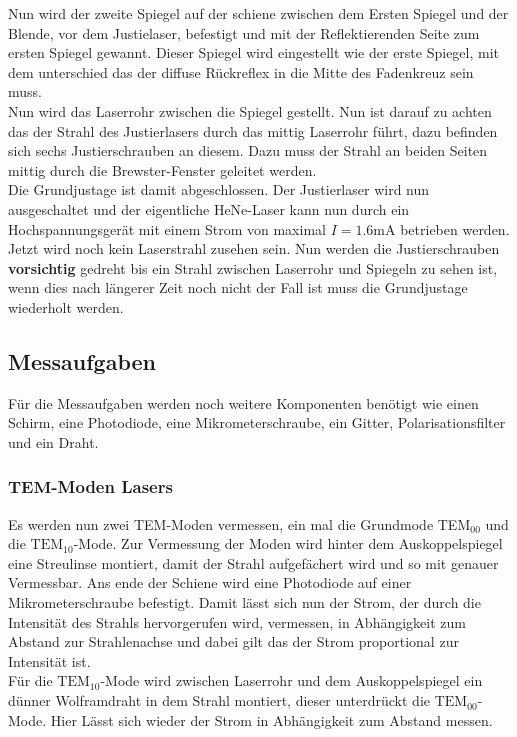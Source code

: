 Nun wird der zweite Spiegel auf der schiene zwischen dem Ersten Spiegel und der Blende, vor dem Justielaser, befestigt und mit der Reflektierenden Seite zum ersten Spiegel gewannt. Dieser Spiegel wird eingestellt wie der erste Spiegel, mit dem unterschied das der diffuse Rückreflex in die Mitte des Fadenkreuz sein muss.\\
Nun wird das Laserrohr zwischen die Spiegel gestellt. Nun ist darauf zu achten das der Strahl des Justierlasers durch das mittig Laserrohr führt, dazu befinden sich sechs Justierschrauben an diesem. Dazu muss der Strahl an beiden Seiten mittig durch die Brewster-Fenster geleitet werden.\\
Die Grundjustage ist damit abgeschlossen. Der Justierlaser wird nun ausgeschaltet und der eigentliche HeNe-Laser kann nun durch ein Hochspannungsgerät mit einem Strom von maximal $I=1.6$mA betrieben werden. Jetzt wird noch kein Laserstrahl zusehen sein. Nun werden die Justierschrauben \textbf{vorsichtig} gedreht bis ein Strahl zwischen Laserrohr und Spiegeln zu sehen ist, wenn dies nach längerer Zeit noch nicht der Fall ist muss die Grundjustage wiederholt werden.\\


\subsection{Messaufgaben}
Für die Messaufgaben werden noch weitere Komponenten benötigt wie einen Schirm, eine Photodiode, eine Mikrometerschraube, ein Gitter, Polarisationsfilter und ein Draht.
\subsubsection{$\mathbf{TEM}$-Moden Lasers}
Es werden nun zwei TEM-Moden vermessen, ein mal die Grundmode TEM${}_{00}$ und die $\mathrm{TEM}_{10}$-Mode. Zur Vermessung der Moden wird hinter dem Auskoppelspiegel eine Streulinse montiert, damit der Strahl aufgefächert wird und so mit genauer Vermessbar. Ans ende der Schiene wird eine Photodiode auf einer Mikrometerschraube befestigt. Damit lässt sich nun der Strom, der durch die Intensität des Strahls hervorgerufen wird, vermessen, in Abhängigkeit zum Abstand zur Strahlenachse und dabei gilt das der Strom proportional zur Intensität ist. \\
Für die $\mathrm{TEM}_{10}$-Mode wird zwischen Laserrohr und dem Auskoppelspiegel ein dünner Wolframdraht in dem Strahl montiert, dieser unterdrückt die $\mathrm{TEM}_{00}$-Mode. Hier Lässt sich wieder der Strom in Abhängigkeit zum Abstand messen.
